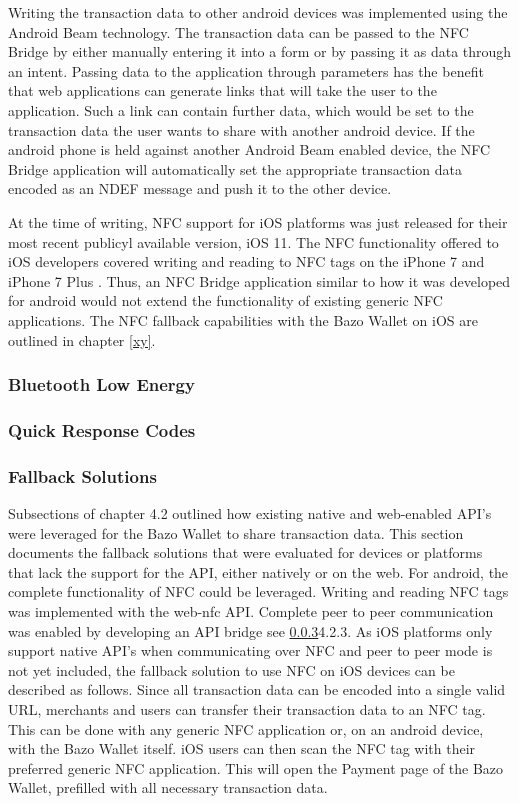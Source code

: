 \documentclass[a4paper]{article}
\begin{document}
Writing the transaction data to other android devices was implemented using the Android Beam technology.
The transaction data can be passed to the NFC Bridge by either manually entering it into a form or by passing it as data through an intent. Passing data to the application through parameters has the benefit that web applications can generate links that will take the user to the application. Such a link can contain further data, which would be set to the transaction data the user wants to share with another android device.
If the android phone is held against another Android Beam enabled device, the NFC Bridge application will automatically set the appropriate transaction data encoded as an NDEF message and push it to the other device.

At the time of writing, NFC support for iOS platforms was just released for their most recent publicyl available version, iOS 11. The NFC functionality offered to iOS developers covered writing and reading to NFC tags on the iPhone 7 and iPhone 7 Plus \cite{corenfc}. Thus, an NFC Bridge application similar to how it was developed for android would not extend the functionality of existing generic NFC applications. The NFC fallback capabilities with the Bazo Wallet on iOS are outlined in chapter \ref{xy}.
\subsubsection{Bluetooth Low Energy}
\subsubsection{Quick Response Codes}
\subsubsection{Fallback Solutions}
Subsections of chapter 4.2 outlined how existing native and web-enabled API's were leveraged for the Bazo Wallet to share transaction data. This section documents the fallback solutions that were evaluated for devices or platforms that lack the support for the API, either natively or on the web.
For android, the complete functionality of NFC could be leveraged. Writing and reading NFC tags was implemented with the web-nfc API. Complete peer to peer communication was enabled by developing an API bridge see \ref{}4.2.3.
As iOS platforms only support native API's when communicating over NFC and peer to peer mode is not yet included, the fallback solution to use NFC on iOS devices can be described as follows. Since all transaction data can be encoded into a single valid URL, merchants and users can transfer their transaction data to an NFC tag. This can be done with any generic NFC application or, on an android device, with the Bazo Wallet itself. iOS users can then scan the NFC tag with their preferred generic NFC application. This will open the Payment page of the Bazo Wallet, prefilled with all necessary transaction data.
\end{document}
